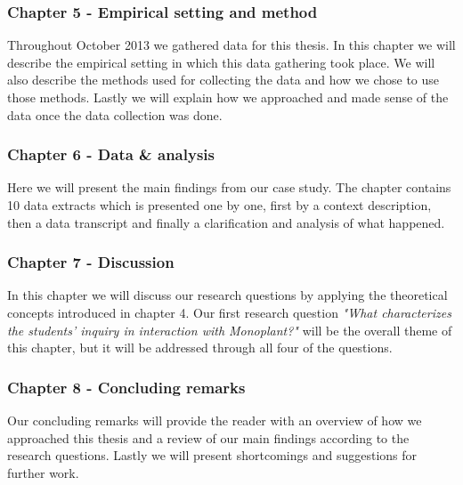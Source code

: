 \subsubsection*{Chapter 5 - Empirical setting and method}

Throughout October 2013 we gathered data for this thesis. In this chapter we will describe the empirical setting in which this data gathering took place. We will also describe the methods used for collecting the data and how we chose to use those methods. Lastly we will explain how we approached and made sense of the data once the data collection was done. 

\subsubsection*{Chapter 6 - Data \& analysis}
Here we will present the main findings from our case study. The chapter contains 10 data extracts which is presented one by one, first by a context description, then a data transcript and finally a clarification and analysis of what happened. 

\subsubsection*{Chapter 7 - Discussion}
In this chapter we will discuss our research questions by applying the theoretical concepts introduced in chapter 4. Our first research question \emph{"What characterizes the students’ inquiry in interaction with Monoplant?"} will be the overall theme of this chapter, but it will be addressed through all four of the questions.

\subsubsection*{Chapter 8 - Concluding remarks}
Our concluding remarks will provide the reader with an overview of how we approached this thesis and a review of our main findings according to the research questions. Lastly we will present shortcomings and suggestions for further work.